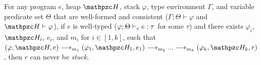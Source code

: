 
\begin{thm}\label{thm:blame} For any \lang
  program $e$, heap $\heap$, stack
$\varphi$, type environment $\Gamma$, and variable predicate set $\Theta$
that are well-formed and consistent
($\Gamma;\Theta\vdash \varphi$ and $\heap \vdash \varphi$),
if $e$ is well-typed ($\varphi;\Theta\vdash_{\textcolor{blue}{\texttt{c}}} e :
\tau$ for some $\tau$) and there exists
$\varphi_i$, $\heap_i$, $e_i$, and $m_i$ for $i\in [1,k]$, such that
$(\varphi,\heap,e) \longrightarrow_{m_1} (\varphi_1,\heap_1,e_1)\longrightarrow_{m_2} ...\longrightarrow_{m_k} (\varphi_k,\heap_k,r)$, then $r$ can never be \emph{stuck}.
\end{thm}




